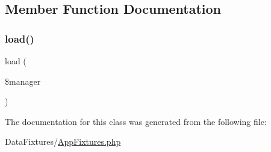 \subsection{Member Function Documentation}
\mbox{\label{class_app_1_1_data_fixtures_1_1_app_fixtures_acb7929747e63056fbc9e2892615c18b2}} 
\subsubsection{\texorpdfstring{load()}{load()}}
{\footnotesize\ttfamily load (\begin{DoxyParamCaption}\item[{Object\+Manager}]{\$manager }\end{DoxyParamCaption})}



The documentation for this class was generated from the following file\+:\begin{DoxyCompactItemize}
\item 
Data\+Fixtures/\mbox{\hyperlink{_app_fixtures_8php}{App\+Fixtures.\+php}}\end{DoxyCompactItemize}
